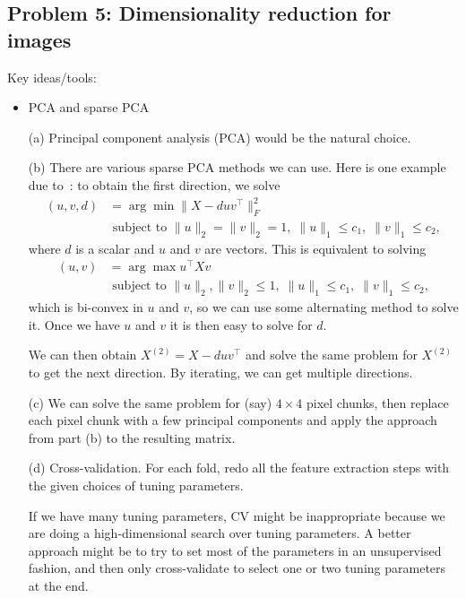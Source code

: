 \subsection*{Problem 5: Dimensionality reduction for images}
Key ideas/tools:
\begin{itemize}
\item PCA and sparse PCA
\end{itemize}


\begin{enumerate}
\item[(a)] Principal component analysis (PCA) would be the natural choice.

\item[(b)] There are various sparse PCA methods we can use. Here is one example due to~\citet*{witten2009penalized}: to obtain the first direction, we solve
\begin{align*}
(u,v,d) &= \arg \min\|X-duv^\top\|_F^2 \\ 
&\text{ subject to } \|u\|_2 = \|v\|_2 = 1, \; \|u\|_1 \leq c_1, \; \|v\|_1 \leq c_2,
\end{align*}
where $d$ is a scalar and $u$ and $v$ are vectors. This is equivalent to solving
\begin{align*}
(u,v) &= \arg \max u^\top Xv \\ 
&\text{ subject to } \|u\|_2, \|v\|_2 \leq 1, \; \|u\|_1 \leq c_1, \; \|v\|_1 \leq c_2,
\end{align*}
which is bi-convex in $u$ and $v$, so we can use some alternating method to solve it. Once we have $u$ and $v$ it is then easy to solve for $d$.
		
We can then obtain $X^{(2)} = X - duv^\top$ and solve the same problem for $X^{(2)}$ to get the next direction. By iterating, we can get multiple directions.

\item[(c)] We can solve the same problem for (say) $4\times 4$ pixel chunks, then replace each pixel chunk with a few principal components and apply the approach from part (b) to the resulting matrix.

\item[(d)] Cross-validation.  For each fold, redo all the feature extraction steps with the given choices of tuning parameters.
		
If we have many tuning parameters, CV might be inappropriate because we are doing a high-dimensional search over tuning parameters.  A better approach might be to try to set most of the parameters in an unsupervised fashion, and then only cross-validate to select one or two tuning parameters at the end.

\end{enumerate}


